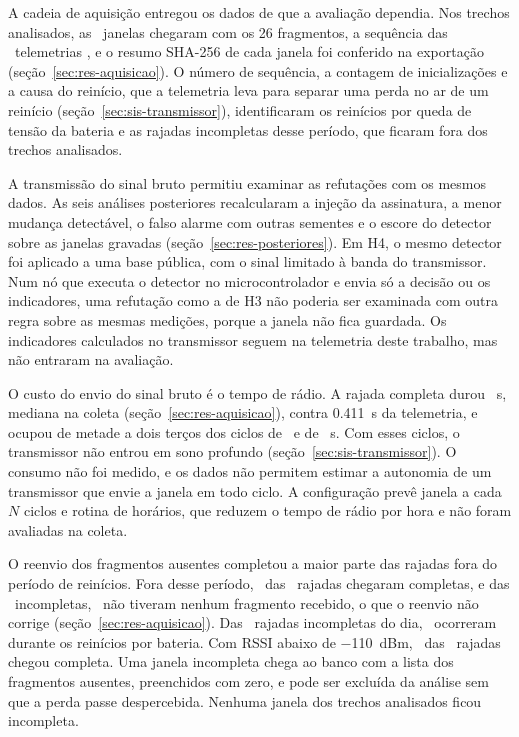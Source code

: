 A cadeia de aquisição entregou os dados de que a avaliação dependia. Nos trechos analisados, as \campoJanelas\ janelas chegaram com os \num{26} fragmentos, a sequência das \campoLeituras\ telemetrias \campoLacunasTexto, e o resumo SHA-256 de cada janela foi conferido na exportação (seção~\ref{sec:res-aquisicao}). O número de sequência, a contagem de inicializações e a causa do reinício, que a telemetria leva para separar uma perda no ar de um reinício (seção~\ref{sec:sis-transmissor}), identificaram os reinícios por queda de tensão da bateria e as rajadas incompletas desse período, que ficaram fora dos trechos analisados.

A transmissão do sinal bruto permitiu examinar as refutações com os mesmos dados. As seis análises posteriores recalcularam a injeção da assinatura, a menor mudança detectável, o falso alarme com outras sementes e o escore do detector sobre as janelas gravadas (seção~\ref{sec:res-posteriores}). Em H4, o mesmo detector foi aplicado a uma base pública, com o sinal limitado à banda do transmissor. Num nó que executa o detector no microcontrolador e envia só a decisão ou os indicadores, uma refutação como a de H3 não poderia ser examinada com outra regra sobre as mesmas medições, porque a janela não fica guardada. Os indicadores calculados no transmissor seguem na telemetria deste trabalho, mas não entraram na avaliação.

O custo do envio do sinal bruto é o tempo de rádio. A rajada completa durou \rajadasDuracaoMediana~s, mediana na coleta (seção~\ref{sec:res-aquisicao}), contra \SI{0,411}{\second} da telemetria, e ocupou de metade a dois terços dos ciclos de \campoCicloUm\ e de \campoCicloDois~s. Com esses ciclos, o transmissor não entrou em sono profundo (seção~\ref{sec:sis-transmissor}). O consumo não foi medido, e os dados não permitem estimar a autonomia de um transmissor que envie a janela em todo ciclo. A configuração prevê janela a cada $N$ ciclos e rotina de horários, que reduzem o tempo de rádio por hora e não foram avaliadas na coleta.

O reenvio dos fragmentos ausentes completou a maior parte das rajadas fora do período de reinícios. Fora desse período, \rajadasForaCompletas\ das \rajadasFora\ rajadas chegaram completas, e das \rajadasForaIncompletas\ incompletas, \rajadasForaSemFragmento\ não tiveram nenhum fragmento recebido, o que o reenvio não corrige (seção~\ref{sec:res-aquisicao}). Das \rajadasFalhasTotal\ rajadas incompletas do dia, \rajadasFalhasReinicio\ ocorreram durante os reinícios por bateria. Com RSSI abaixo de \SI{-110}{dBm}, \rajadasAbaixoCentoDezCompletas\ das \rajadasAbaixoCentoDez\ rajadas chegou completa. Uma janela incompleta chega ao banco com a lista dos fragmentos ausentes, preenchidos com zero, e pode ser excluída da análise sem que a perda passe despercebida. Nenhuma janela dos trechos analisados ficou incompleta.

